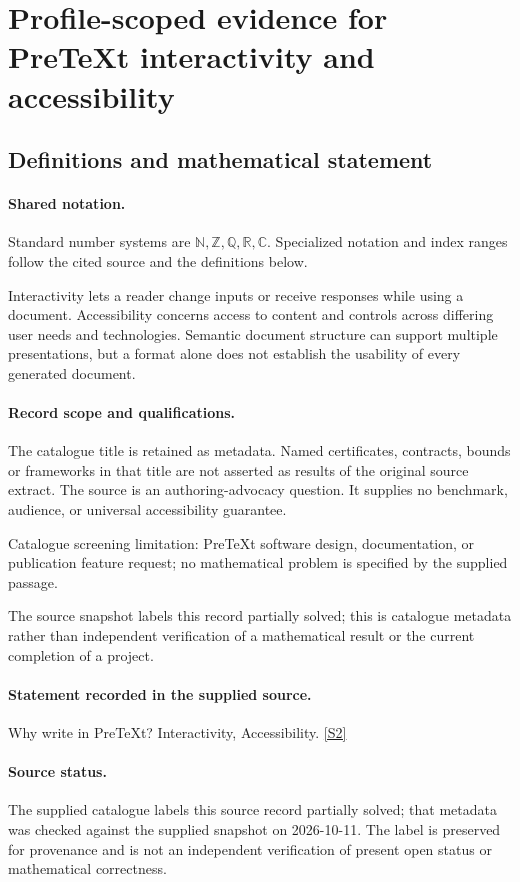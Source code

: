 \documentclass[11pt]{article}
\newcommand{\sref}[2]{\hyperlink{source:#1:#2}{[S#2]}}
\begin{document}
\section{Profile-scoped evidence for PreTeXt interactivity and accessibility}\label{statement}

\subsection{Definitions and mathematical statement}

\paragraph{Shared notation.}Standard number systems are $\mathbb N,\mathbb Z,\mathbb Q,\mathbb R,\mathbb C$. Specialized notation and index ranges follow the cited source and the definitions below.


Interactivity lets a reader change inputs or receive responses while using a document. Accessibility concerns access to content and controls across differing user needs and technologies. Semantic document structure can support multiple presentations, but a format alone does not establish the usability of every generated document.
\paragraph{Record scope and qualifications.}
The catalogue title is retained as metadata. Named certificates, contracts, bounds or frameworks in that title are not asserted as results of the original source extract.
The source is an authoring-advocacy question. It supplies no benchmark, audience, or universal accessibility guarantee.

Catalogue screening limitation: PreTeXt software design, documentation, or publication feature request; no mathematical problem is specified by the supplied passage.

The source snapshot labels this record partially solved; this is catalogue metadata rather than independent verification of a mathematical result or the current completion of a project.
\paragraph{Statement recorded in the supplied source.}
Why write in PreTeXt? Interactivity, Accessibility. \sref{statement}{2}
\paragraph{Source status.}
The supplied catalogue labels this source record partially solved; that metadata was checked against the supplied snapshot on 2026-10-11. The label is preserved for provenance and is not an independent verification of present open status or mathematical correctness.
\end{document}
